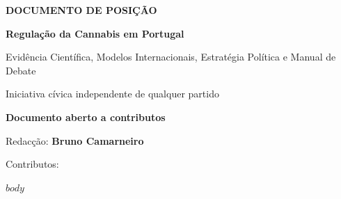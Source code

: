 \documentclass[a4paper,11pt]{article}
\begin{document}
\begin{titlepage}
    \centering
    \vspace*{3cm}

    {\fontsize{18}{22}\selectfont\bfseries\color{azulLivre} DOCUMENTO DE POSIÇÃO\par}
    \vspace{1.2cm}

    {\fontsize{15}{18}\selectfont\bfseries Regulação da Cannabis em Portugal\par}
    \vspace{1cm}

    {\fontsize{12}{14}\selectfont Evidência Científica, Modelos Internacionais, Estratégia Política e Manual de Debate\par}
    \vspace{2.5cm}

    {\fontsize{11}{13}\selectfont Iniciativa cívica independente de qualquer partido\par}
    \vspace{2.5cm}

    {\fontsize{11}{13}\selectfont\bfseries Documento aberto a contributos\par}
    \vspace{1.5cm}

    {\fontsize{11}{13}\selectfont Redacção: \textbf{Bruno Camarneiro}\par}
    \vspace{0.5cm}

    {\fontsize{11}{13}\selectfont Contributos:\par}

    \vfill
\end{titlepage}

\tableofcontents
\newpage

$body$
\end{document}
